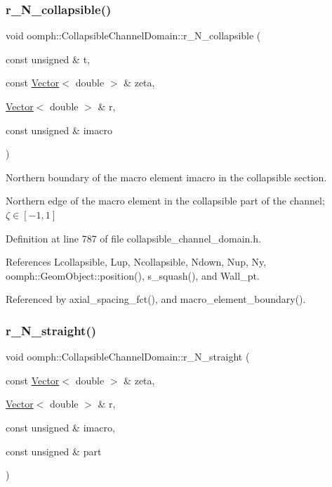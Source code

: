 \subsubsection{\texorpdfstring{r\+\_\+\+N\+\_\+collapsible()}{r\_N\_collapsible()}}
{\footnotesize\ttfamily void oomph\+::\+Collapsible\+Channel\+Domain\+::r\+\_\+\+N\+\_\+collapsible (\begin{DoxyParamCaption}\item[{const unsigned \&}]{t,  }\item[{const \hyperlink{classoomph_1_1Vector}{Vector}$<$ double $>$ \&}]{zeta,  }\item[{\hyperlink{classoomph_1_1Vector}{Vector}$<$ double $>$ \&}]{r,  }\item[{const unsigned \&}]{imacro }\end{DoxyParamCaption})\hspace{0.3cm}{\ttfamily [private]}}



Northern boundary of the macro element imacro in the collapsible section. 

Northern edge of the macro element in the collapsible part of the channel; $ \zeta \in [-1,1] $ 

Definition at line 787 of file collapsible\+\_\+channel\+\_\+domain.\+h.



References Lcollapsible, Lup, Ncollapsible, Ndown, Nup, Ny, oomph\+::\+Geom\+Object\+::position(), s\+\_\+squash(), and Wall\+\_\+pt.



Referenced by axial\+\_\+spacing\+\_\+fct(), and macro\+\_\+element\+\_\+boundary().

\mbox{\label{classoomph_1_1CollapsibleChannelDomain_aec5509d4e6a229da9fec78ceb78dcb18}} 
\subsubsection{\texorpdfstring{r\+\_\+\+N\+\_\+straight()}{r\_N\_straight()}}
{\footnotesize\ttfamily void oomph\+::\+Collapsible\+Channel\+Domain\+::r\+\_\+\+N\+\_\+straight (\begin{DoxyParamCaption}\item[{const \hyperlink{classoomph_1_1Vector}{Vector}$<$ double $>$ \&}]{zeta,  }\item[{\hyperlink{classoomph_1_1Vector}{Vector}$<$ double $>$ \&}]{r,  }\item[{const unsigned \&}]{imacro,  }\item[{const unsigned \&}]{part }\end{DoxyParamCaption})\hspace{0.3cm}{\ttfamily [private]}}



